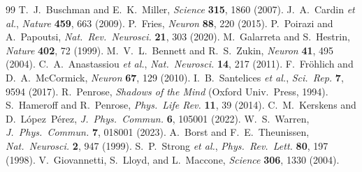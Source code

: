 \documentclass[twocolumn,10pt]{article}
\begin{document}
\begin{thebibliography}{99}
 T.~J.~Buschman and E.~K.~Miller,
\textit{Science} \textbf{315}, 1860 (2007).
 J.~A.~Cardin \textit{et al.},
\textit{Nature} \textbf{459}, 663 (2009).
 P.~Fries,
\textit{Neuron} \textbf{88}, 220 (2015).
 P.~Poirazi and A.~Papoutsi,
\textit{Nat.\ Rev.\ Neurosci.} \textbf{21}, 303 (2020).
 M.~Galarreta and S.~Hestrin,
\textit{Nature} \textbf{402}, 72 (1999).
 M.~V.~L.~Bennett and R.~S.~Zukin,
\textit{Neuron} \textbf{41}, 495 (2004).
 C.~A.~Anastassiou \textit{et al.},
\textit{Nat.\ Neurosci.} \textbf{14}, 217 (2011).
 F.~Fr\"ohlich and D.~A.~McCormick,
\textit{Neuron} \textbf{67}, 129 (2010).
 I.~B.~Santelices \textit{et al.},
\textit{Sci.\ Rep.} \textbf{7}, 9594 (2017).
 R.~Penrose, \textit{Shadows of the Mind} (Oxford
Univ.\ Press, 1994).
 S.~Hameroff and R.~Penrose,
\textit{Phys.\ Life Rev.} \textbf{11}, 39 (2014).
 C.~M.~Kerskens and D.~L\'opez~P\'erez,
\textit{J.\ Phys.\ Commun.} \textbf{6}, 105001 (2022).
 W.~S.~Warren,
\textit{J.\ Phys.\ Commun.} \textbf{7}, 018001 (2023).
 A.~Borst and F.~E.~Theunissen,
\textit{Nat.\ Neurosci.} \textbf{2}, 947 (1999).
 S.~P.~Strong \textit{et al.},
\textit{Phys.\ Rev.\ Lett.} \textbf{80}, 197 (1998).
 V.~Giovannetti, S.~Lloyd, and L.~Maccone,
\textit{Science} \textbf{306}, 1330 (2004).

\end{thebibliography}
\end{document}
